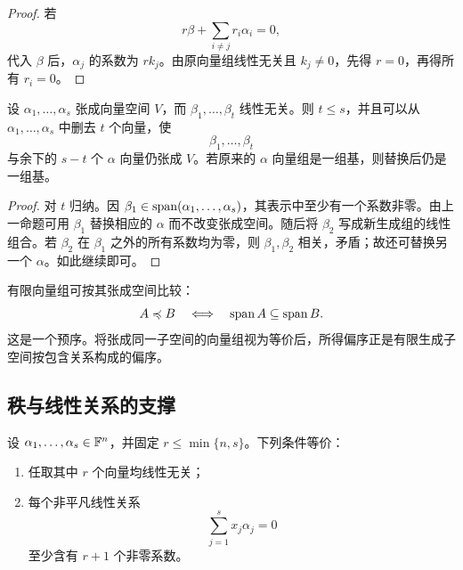 \begin{proof}
若
\begin{equation}
 r\beta+\sum_{i\neq j}r_i\alpha_i=0,
\end{equation}
代入 $\beta$ 后，$\alpha_j$ 的系数为 $rk_j$。由原向量组线性无关且 $k_j\neq0$，先得 $r=0$，再得所有 $r_i=0$。
\end{proof}

\begin{theorem}
设 $\alpha_1,\ldots,\alpha_s$ 张成向量空间 $V$，而 $\beta_1,\ldots,\beta_t$ 线性无关。则 $t\leq s$，并且可以从 $\alpha_1,\ldots,\alpha_s$ 中删去 $t$ 个向量，使
\begin{equation}
 \beta_1,\ldots,\beta_t
\end{equation}
与余下的 $s-t$ 个 $\alpha$ 向量仍张成 $V$。若原来的 $\alpha$ 向量组是一组基，则替换后仍是一组基。
\end{theorem}

\begin{proof}
对 $t$ 归纳。因 $\beta_1\in\operatorname{span}(\alpha_1,\ldots,\alpha_s)$，其表示中至少有一个系数非零。由上一命题可用 $\beta_1$ 替换相应的 $\alpha$ 而不改变张成空间。随后将 $\beta_2$ 写成新生成组的线性组合。若 $\beta_2$ 在 $\beta_1$ 之外的所有系数均为零，则 $\beta_1,\beta_2$ 相关，矛盾；故还可替换另一个 $\alpha$。如此继续即可。
\end{proof}

\begin{remark}
有限向量组可按其张成空间比较：
\begin{equation}
 A\preccurlyeq B
 \quad\Longleftrightarrow\quad
 \operatorname{span} A\subseteq\operatorname{span} B.
\end{equation}
这是一个预序。将张成同一子空间的向量组视为等价后，所得偏序正是有限生成子空间按包含关系构成的偏序。
\end{remark}

\subsection{秩与线性关系的支撑}

\begin{proposition}
设 $\alpha_1,\ldots,\alpha_s\in\mathbb F^n$，并固定 $r\leq\min\{n,s\}$。下列条件等价：
\begin{enumerate}
  \item 任取其中 $r$ 个向量均线性无关；
  \item 每个非平凡线性关系
  \begin{equation}
   \sum_{j=1}^s x_j\alpha_j=0
  \end{equation}
  至少含有 $r+1$ 个非零系数。
\end{enumerate}
\end{proposition}

